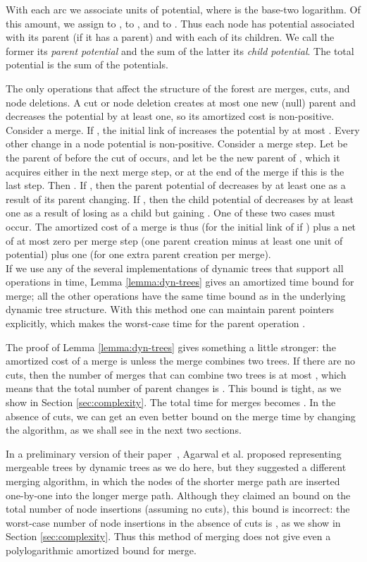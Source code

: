 \documentclass[twoside,leqno,twocolumn]{article}
\newcommand{\proofend}{\\}
\begin{document}
With each arc  we associate  units of potential, where  is the base-two logarithm. Of this amount, we assign  to ,  to , and  to .  Thus each node has potential associated with its parent (if it has a parent) and with each of its children.  We call the former its \emph{parent potential} and the sum of the latter its \emph{child potential}.  The total potential is the sum of the potentials.

The only operations that affect the structure of the forest are merges, cuts, and node deletions.  A cut or node deletion creates at most one new (null) parent and decreases the potential by at least one, so its amortized cost is non-positive. Consider a merge. If , the initial link of  increases the potential by at most . Every other change in a node potential is non-positive. Consider a merge step. Let  be the parent of  before the cut of  occurs, and let  be the new parent of , which it acquires either in the next merge step, or at the end of the merge if this is the last step.  Then .  If , then the parent potential of  decreases by at least one as a result of its parent changing.  If , then the child potential of  decreases by at least one as a result of  losing  as a child but gaining .  One of these two cases must occur. The amortized cost of a merge is thus  (for the initial link of  if ) plus a net of at most zero per merge step (one parent creation minus at least one unit of potential) plus one (for one extra parent creation per merge).
\proofend

If we use any of the several implementations of dynamic trees that support all operations in  time, Lemma \ref{lemma:dyn-trees} gives an  amortized time bound for merge; all the other operations have the same time bound as in the underlying dynamic tree structure.  With this method one can maintain parent pointers explicitly, which makes the worst-case time for the parent operation .

The proof of Lemma \ref{lemma:dyn-trees} gives something a little stronger: the amortized cost of a merge is  unless the merge combines two trees.  If there are no cuts, then the number of merges that can combine two trees is at most ,
which means that the total number of parent changes is . This bound is tight, as we show in Section \ref{sec:complexity}.  The total time for merges becomes .  In the absence of cuts, we can get an even better bound on the merge time by changing the algorithm, as we shall see in the next two sections.

In a preliminary version of their paper~\cite{AEHW04}, Agarwal et al. proposed representing mergeable trees by dynamic trees as we do here, but they suggested a different merging algorithm, in which the nodes of the shorter merge path are inserted one-by-one into the longer merge path.  Although they claimed an  bound on the total number of node insertions (assuming no cuts), this bound is incorrect: the worst-case number of node insertions in the absence of cuts is , as we show in Section \ref{sec:complexity}.  Thus this method of merging does not give even a polylogarithmic amortized bound for merge.
\end{document}
